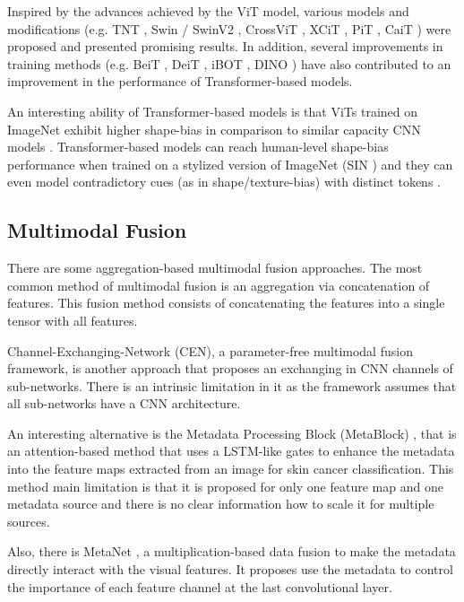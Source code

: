 \documentclass[conference]{IEEEtran}
\begin{document}
Inspired by the advances achieved by the ViT model, various models and modifications (e.g. TNT \cite{han2021transformer}, Swin \cite{liu2021swin} / SwinV2 \cite{liu2021swinv2}, CrossViT \cite{chen2021crossvit}, XCiT \cite{el2021xcit}, PiT \cite{heo2021rethinking}, CaiT \cite{touvron2021going}
) were proposed and presented promising results. In addition, several improvements in training methods (e.g. BeiT \cite{bao2021beit}, DeiT \cite{touvron2021deit}, iBOT \cite{zhou2021ibot}, DINO \cite{caron2021dino}) have also contributed to an improvement in the performance of Transformer-based models.

An interesting ability of Transformer-based models is that ViTs trained on ImageNet exhibit higher shape-bias in comparison to similar capacity CNN models \cite{naseer2021intriguing}. Transformer-based models can reach human-level shape-bias performance when trained on a stylized version of ImageNet (SIN \cite{geirhos2018imagenet}) and they can even model contradictory cues (as in shape/texture-bias) with distinct tokens \cite{naseer2021intriguing}.

\subsection{Multimodal Fusion}

There are some aggregation-based multimodal fusion approaches. The most common method of multimodal fusion is an aggregation via concatenation of features\cite{pacheco2020impact}. This fusion method consists of concatenating the features into a single tensor with all features. 

Channel-Exchanging-Network (CEN)\cite{Wang2020FusionCEN}, a parameter-free multimodal fusion framework, is another approach that proposes an exchanging in CNN channels of sub-networks. There is an intrinsic limitation in it as the framework assumes that all sub-networks have a CNN architecture.

An interesting alternative is the Metadata Processing Block
(MetaBlock) \cite{Pacheco2021FusionMetaBlock}, that is an attention-based method that uses a LSTM-like gates to enhance the metadata into the feature maps extracted from an image for skin cancer classification. This method main limitation is that it is proposed for only one feature map and one metadata source and there is no clear information how to scale it for multiple sources.

Also, there is MetaNet \cite{Li2020FusionMetaNet}, a multiplication-based data fusion to make the metadata directly interact with the visual features. It proposes use the metadata to control the importance of each feature channel at the last convolutional layer.
\end{document}
